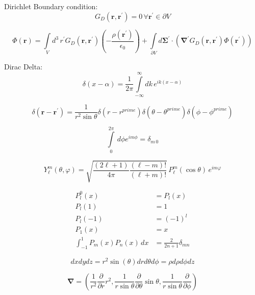 \documentclass[a4paper, twocolumn]{article}
\renewcommand{\vec}[1]{\boldsymbol{#1}}
\begin{document}
Dirichlet Boundary condition:
\begin{equation*}
    G_{D}(\vec{r}, \vec{r}^{\prime}) = 0 \, \forall \vec{r}^{\prime} \in \partial V
\end{equation*}

\begin{equation*}
    \Phi(\vec{r}) =
    \int\limits_{V} d^{3} \, r^{\prime} G_{D}(\vec{r}, \vec{r}^{\prime}) \left( - \frac{\rho(\vec{r}^{\prime})}{\epsilon_{0}}\right)
    + \int\limits_{\partial V} d \vec{\Sigma}^{\prime} \cdot \left( \vec{\nabla}^{\prime} G_{D}(\vec{r}, \vec{r}^{\prime}) \Phi(\vec{r}^{\prime})  \right)
\end{equation*}


Dirac Delta:
\begin{equation*}
    \delta(x-\alpha) = \frac{1}{2\pi} \int\limits_{-\infty}^{\infty} dk \, e^{ik(x-\alpha)}
\end{equation*}

\begin{equation*}
    \delta(\vec{r} - \vec{r}^{\prime}) = \frac{1}{r^2 \sin\theta} \delta(r-r^{prime}) \delta(\theta-\theta^{prime}) \delta(\phi-\phi^{prime})
\end{equation*}

\begin{equation*}
    \int\limits_{0}^{2 \pi} \, d\phi e^{i m \phi}= \delta_{m \, 0}
\end{equation*}

\begin{equation*}
    Y_\ell^m( \theta , \varphi ) = \sqrt{\frac{(2\ell+1)}{ 4\pi}\frac{(\ell-m)! }{ (\ell+m)!}}  \, P_\ell^m ( \cos{\theta} ) \, e^{i m \varphi }
\end{equation*}


\begin{align*}
    P_{l}^{0}(x) &= P_{l}(x) \\
    P_{l}(1) &= 1 \\
    P_{l}(-1) &= (-1)^{l} \\
    P_{1}(x) &= x \\
    \int_{-1}^1 P_m(x) P_n(x)\,dx &= \frac{2}{2n + 1} \delta_{mn}
\end{align*}


\begin{equation*}
    dxdydz = r^{2} \sin(\theta) dr d\theta d\phi = \rho d\rho d\phi dz
\end{equation*}

\begin{equation*}
    \vec{\nabla} = (\frac{1}{r^2} \frac{\partial}{\partial r} r^2, \frac{1}{r\sin\theta} \frac{\partial}{\partial \theta} \sin\theta, \frac{1}{r\sin\theta} \frac{\partial}{\partial \phi})
\end{equation*}
\end{document}
